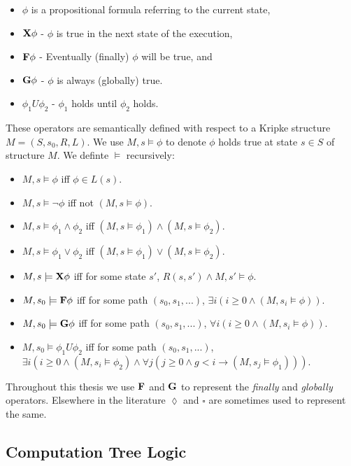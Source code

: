 \begin{itemize}
    \item $\phi$ is a propositional formula referring to the current state,
    \item $\textbf{X}\phi$ - $\phi$ is true in the next state of the execution,
    \item $\textbf{F}\phi$ - Eventually (finally) $\phi$ will be true, and
    \item $\textbf{G}\phi$ - $\phi$ is always (globally) true.
    \item $\phi_1 U \phi_2$ - $\phi_1$ holds until $\phi_2$ holds.
\end{itemize}

These operators are semantically defined with respect to a Kripke structure $M
= (S, s_0, R, L)$. We use $M, s \models \phi$ to denote $\phi$ holds true at
state $s \in S$ of structure $M$. We definte $\models$ recursively:

\begin{itemize}
    \item $M, s \models \phi$ iff $\phi \in L(s)$.
    \item $M, s \models \lnot\phi$ iff not $(M, s \models \phi)$.
    \item $M, s \models \phi_1 \land \phi_2$ iff $(M, s \models \phi_1) \land (M, s \models \phi_2)$.
    \item $M, s \models \phi_1 \lor \phi_2$ iff $(M, s \models \phi_1) \lor (M, s \models \phi_2)$.
    \item $M, s \models \textbf{X}\phi$ iff for some state $s'$, $R(s, s') \land M, s' \models \phi$.
    \item $M, s_0 \models \textbf{F}\phi$ iff for some path $(s_0, s_1, ...)$, $\exists i (i \geq 0 \land (M, s_i \models \phi))$.
    \item $M, s_0 \models \textbf{G}\phi$ iff for some path $(s_0, s_1, ...)$, $\forall i (i \geq 0 \land (M, s_i \models \phi))$.
    \item $M, s_0 \models \phi_1 U \phi_2$ iff for some path $(s_0, s_1, ...)$, $\exists i (i \geq 0 \land (M, s_i \models \phi_2) \land \forall j (j \geq 0 \land g < i \to (M, s_j \models \phi_1)))$.
\end{itemize}

Throughout this thesis we use $\textbf{F}$ and $\textbf{G}$ to represent the \emph{finally} and \emph{globally} operators. Elsewhere in the literature $\lozenge$ and $\square$ are sometimes used to represent the same.  

\subsection{Computation Tree Logic}

